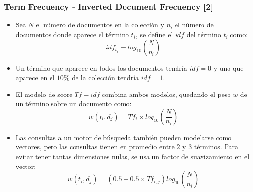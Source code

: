 \documentclass[handout]{beamer}
\begin{document}
\begin{frame}\frametitle{Term Frecuency - Inverted Document Frecuency [2]}
\footnotesize{ 
\begin{itemize}
 \item Sea $N$ el número de documentos en la colección y $n_{i}$ el número de documentos donde aparece el término $t_{i}$, se define el $idf$ del término $t_{i}$ como: 
 \begin{displaymath}
  idf_{t_{i}}= log_{10}(\frac{N}{n_{i}})
 \end{displaymath}
\item Un término que aparece en todos los documentos tendría $idf=0$ y uno que aparece en el $10\%$ de la colección tendría $idf=1$.

\item El modelo de score $Tf-idf$ combina ambos modelos, quedando el peso $w$ de un término sobre un documento como:
\begin{displaymath}
w(t_{i},d_{j})=Tf_{i}\times log_{10}(\frac{N}{n_{i}}) 
\end{displaymath}

\item Las consultas a un motor de búsqueda también pueden modelarse como vectores, pero las consultas tienen en promedio entre $2$ y $3$ términos. Para evitar tener tantas dimensiones nulas, se usa un factor de suavizamiento en el vector:
\begin{displaymath}
 w(t_{i},d_{j})=(0.5+0.5\times Tf_{i,j})log_{10}(\frac{N}{n_{i}}) 
\end{displaymath}



\end{itemize}



}

\end{frame}
\end{document}
